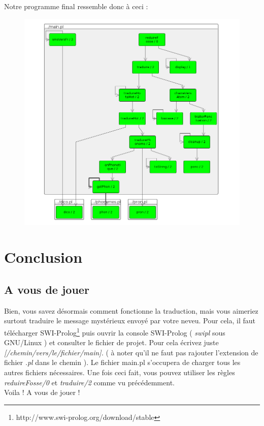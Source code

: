 \documentclass[11pt]{report}
\begin{document}
	Notre programme final ressemble donc à ceci :\\
	\begin{figure}[htp]
	\centering
	\includegraphics[scale=0.60]{mainpl.png}
	\end{figure}
 
\chapter{Conclusion}
	\section{A vous de jouer}
	Bien, vous savez désormais comment fonctionne la traduction, mais vous aimeriez surtout traduire le message mystérieux envoyé par votre neveu. Pour cela, il faut télécharger SWI-Prolog\footnote{http://www.swi-prolog.org/download/stable} puis ouvrir la console SWI-Prolog ( {\em swipl} sous GNU/Linux ) et consulter le fichier de projet. Pour cela écrivez juste {\em [/chemin/vers/le/fichier/main].} ( à noter qu'il ne faut pas rajouter l'extension de fichier {\em .pl} dans le chemin ). Le fichier main.pl s'occupera de charger tous les autres fichiers nécessaires. Une fois ceci fait, vous pouvez utiliser les règles {\em reduireFosse/0} et {\em traduire/2} comme vu précédemment.\\
	Voila ! A vous de jouer !
	
\end{document}
